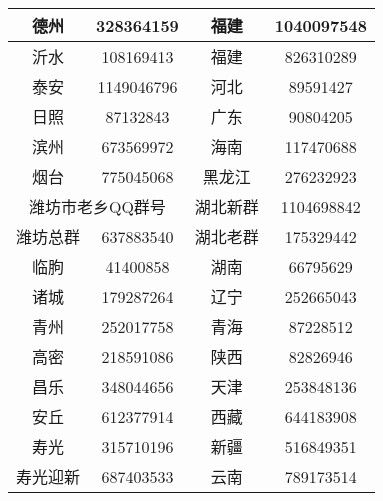 \begin{table}[!ht]
\begin{tabular}{|c|c|c|c|}
        德州                              & 328364159                       & 福建         & 1040097548 \\ \hline
        沂水                              & 108169413                       & 福建         & 826310289  \\ \hline
        泰安                              & 1149046796                      & 河北         & 89591427   \\ \hline
        日照                              & 87132843                        & 广东         & 90804205   \\ \hline
        滨州                              & 673569972                       & 海南         & 117470688  \\ \hline
        烟台                              & 775045068                       & 黑龙江        & 276232923  \\ \hline
        \multicolumn{2}{|c|}{潍坊市老乡QQ群号} & 湖北新群                           & 1104698842              \\ \hline
        潍坊总群                            & 637883540                       & 湖北老群       & 175329442  \\ \hline
        临朐                              & 41400858                        & 湖南         & 66795629   \\ \hline
        诸城                              & 179287264                       & 辽宁         & 252665043  \\ \hline
        青州                              & 252017758                       & 青海         & 87228512   \\ \hline
        高密                              & 218591086                       & 陕西         & 82826946   \\ \hline
        昌乐                              & 348044656                       & 天津         & 253848136  \\ \hline
        安丘                              & 612377914                       & 西藏         & 644183908  \\ \hline
        寿光                              & 315710196                       & 新疆         & 516849351  \\ \hline
        寿光迎新                            & 687403533                       & 云南         & 789173514  \\ \hline
    \end{tabular}
\end{table}